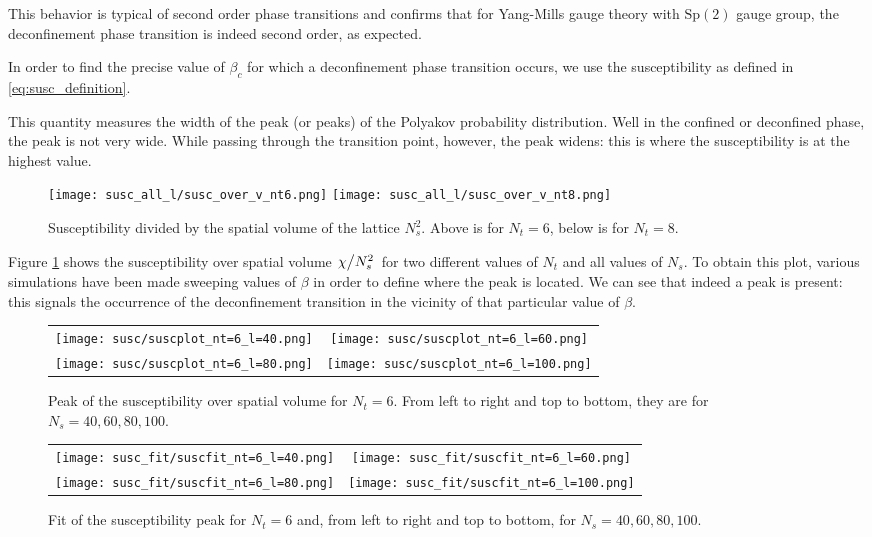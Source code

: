 \documentclass[reqno,12pt]{article}
\numberwithin{equation}{section}
\newcommand{\Sp}{\mathrm{Sp}}
\begin{document}
This behavior is typical of second order phase transitions and confirms that for Yang-Mills gauge theory with $\Sp(2)$
gauge group, the deconfinement phase transition is indeed second order, as expected. 

In order to find the precise value of $\beta_c$ for which a deconfinement phase transition occurs, we use
the susceptibility as defined in \eqref{eq:susc_definition}.

This quantity measures the width of the peak (or peaks) of the Polyakov probability distribution. Well in the
confined or deconfined phase, the peak is not very wide. While passing through the transition point, however,
the peak widens: this is where the susceptibility is at the highest value. 

\begin{figure}[h]
	\centering
	\texttt{[image: susc\_all\_l/susc\_over\_v\_nt6.png]}
	\texttt{[image: susc\_all\_l/susc\_over\_v\_nt8.png]}
	\caption[Susceptibility at all values of $N_s$]{Susceptibility divided by the spatial
	volume of the lattice $N_s^2$. Above is for $N_t = 6$, below is for $N_t=8$.}
\label{fig:susc_over_v_all_ls}
\end{figure}

Figure \ref{fig:susc_over_v_all_ls} shows the susceptibility over spatial volume 
$\flatfrac{\chi}{N_s^2}$ for two different values of $N_t$ and all values of $N_s$. To obtain this plot, various
simulations have been made sweeping values of $\beta$ in order to define where the peak is located. We can see
that indeed a peak is present: this signals the occurrence of the deconfinement transition in the vicinity of that
particular value of $\beta$. 

\begin{figure}[h]
	\centering
	\begin{tabular}{c c}
		\texttt{[image: susc/suscplot\_nt=6\_l=40.png]} &
		\texttt{[image: susc/suscplot\_nt=6\_l=60.png]}
		\\
		\texttt{[image: susc/suscplot\_nt=6\_l=80.png]} &
		\texttt{[image: susc/suscplot\_nt=6\_l=100.png]}
	\end{tabular}	
	\caption[Susceptibility peak for $N_t = 6$]{Peak of the susceptibility over spatial volume for
	$N_t = 6$. From left to right and top to bottom, they are for $N_s = 40, 60, 80, 100$.}
\label{fig:susc_peaks}
\end{figure}

\begin{figure}[h]
	\centering
	\begin{tabular}{c c}
		\texttt{[image: susc\_fit/suscfit\_nt=6\_l=40.png]} &
		\texttt{[image: susc\_fit/suscfit\_nt=6\_l=60.png]}
		\\
		\texttt{[image: susc\_fit/suscfit\_nt=6\_l=80.png]} &
		\texttt{[image: susc\_fit/suscfit\_nt=6\_l=100.png]}
	\end{tabular}
	\caption[Fit of susceptibility peaks with $N_t = 6$]{Fit of the susceptibility peak for $N_t = 6$ and,
	from left to right and top to bottom, for $N_s = 40, 60, 80, 100$.}
\label{fig:susc_peaks_fit}
\end{figure}
\end{document}
